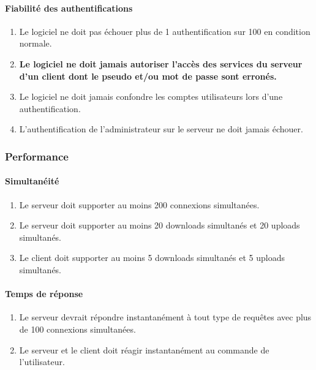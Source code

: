 \documentclass[10pt,a4paper]{report}
\begin{document}
\paragraph{Fiabilité des authentifications}

	\begin{enumerate}
	
		\item Le logiciel ne doit pas échouer plus de 1 authentification sur 100 en condition normale.
		
		\item \textbf{Le logiciel ne doit jamais autoriser l'accès des services du serveur d'un client dont le pseudo et/ou mot de passe sont erronés.}
		
		\item Le logiciel ne doit jamais confondre les comptes utilisateurs lors d'une authentification.
		
		\item L'authentification de l'administrateur sur le serveur ne doit jamais échouer.
		
	\end{enumerate}

\subsubsection{Performance}

\paragraph{Simultanéité}

	\begin{enumerate}
		\item Le serveur doit supporter au moins 200 connexions simultanées.
		\item Le serveur doit supporter au moins 20 downloads simultanés et 20 uploads simultanés.
		\item Le client doit supporter au moins 5 downloads simultanés et 5 uploads simultanés.
	\end{enumerate}
	
\paragraph{Temps de réponse}
	
	\begin{enumerate}
		\item Le serveur devrait répondre instantanément à tout type de requêtes avec plus de 100 connexions simultanées.
		\item Le serveur et le client doit réagir instantanément au commande de l'utilisateur. 
	\end{enumerate}
\end{document}

